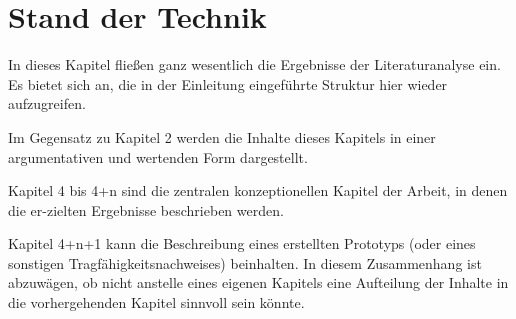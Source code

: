 \chapter{Stand der Technik}
In dieses Kapitel fließen ganz wesentlich die Ergebnisse der Literaturanalyse ein. Es bietet sich an, die in der Einleitung eingeführte Struktur hier wieder aufzugreifen.

Im Gegensatz zu Kapitel 2 werden die Inhalte dieses Kapitels in einer argumentativen und wertenden Form dargestellt.

Kapitel 4 bis 4+n sind die zentralen konzeptionellen Kapitel der Arbeit, in denen die er-zielten Ergebnisse beschrieben werden.

Kapitel 4+n+1 kann die Beschreibung eines erstellten Prototyps (oder eines sonstigen Tragfähigkeitsnachweises) beinhalten. In diesem Zusammenhang ist abzuwägen, ob nicht anstelle eines eigenen Kapitels eine Aufteilung der Inhalte in die vorhergehenden Kapitel sinnvoll sein könnte.